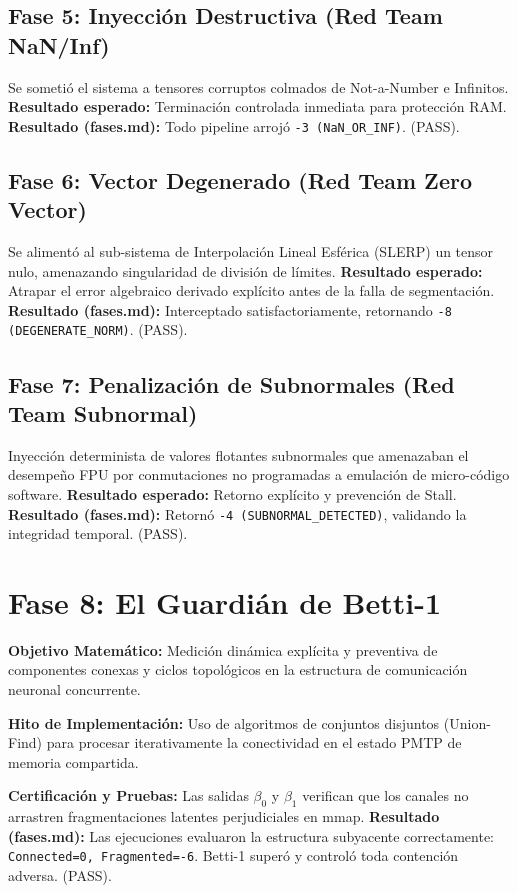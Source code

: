 \subsection{Fase 5: Inyección Destructiva (Red Team NaN/Inf)}
Se sometió el sistema a tensores corruptos colmados de Not-a-Number e Infinitos.
\textbf{Resultado esperado:} Terminación controlada inmediata para protección RAM.
\textbf{Resultado (fases.md):} Todo pipeline arrojó \texttt{-3 (NaN\_OR\_INF)}. (PASS).

\subsection{Fase 6: Vector Degenerado (Red Team Zero Vector)}
Se alimentó al sub-sistema de Interpolación Lineal Esférica (SLERP) un tensor nulo, amenazando singularidad de división de límites.
\textbf{Resultado esperado:} Atrapar el error algebraico derivado explícito antes de la falla de segmentación.
\textbf{Resultado (fases.md):} Interceptado satisfactoriamente, retornando \texttt{-8 (DEGENERATE\_NORM)}. (PASS).

\subsection{Fase 7: Penalización de Subnormales (Red Team Subnormal)}
Inyección determinista de valores flotantes subnormales que amenazaban el desempeño FPU por conmutaciones no programadas a emulación de micro-código software.
\textbf{Resultado esperado:} Retorno explícito y prevención de Stall.
\textbf{Resultado (fases.md):} Retornó \texttt{-4 (SUBNORMAL\_DETECTED)}, validando la integridad temporal. (PASS).

\section{Fase 8: El Guardián de Betti-1}

\textbf{Objetivo Matemático:} Medición dinámica explícita y preventiva de componentes conexas y ciclos topológicos en la estructura de comunicación neuronal concurrente.

\textbf{Hito de Implementación:} Uso de algoritmos de conjuntos disjuntos (Union-Find) para procesar iterativamente la conectividad en el estado PMTP de memoria compartida.

\textbf{Certificación y Pruebas:} Las salidas $\beta_0$ y $\beta_1$ verifican que los canales no arrastren fragmentaciones latentes perjudiciales en mmap.
\textbf{Resultado (fases.md):} Las ejecuciones evaluaron la estructura subyacente correctamente: \texttt{Connected=0, Fragmented=-6}. Betti-1 superó y controló toda contención adversa. (PASS).

